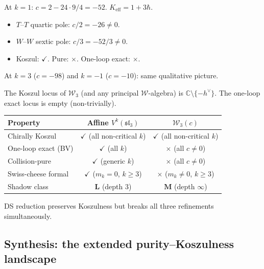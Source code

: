 \documentclass[11pt]{article}
\newcommand{\cW}{\mathcal{W}}
\newcommand{\fsl}{\mathfrak{sl}}
\newcommand{\C}{\mathbb{C}}
\begin{document}
\begin{computation}[Explicit: $\cW_3$ at $k = 1$ ($c = -52$)]
\label{comp:W3-k1}
At $k = 1$: $c = 2 - 24 \cdot 9/4 = -52$.
$K_{\mathrm{eff}} = 1 + 3\hbar$.
\begin{itemize}[nosep]
\item $T$--$T$ quartic pole: $c/2 = -26 \neq 0$.
\item $W$--$W$ sextic pole: $c/3 = -52/3 \neq 0$.
\item Koszul: $\checkmark$.  Pure: $\times$.  One-loop exact: $\times$.
\end{itemize}
At $k = 3$ ($c = -98$) and $k = -1$ ($c = -10$):
same qualitative picture.
\end{computation}

\begin{remark}
The Koszul locus of $\cW_3$ (and any principal
$\cW$-algebra) is $\C \setminus \{-h^\vee\}$.
The one-loop exact locus is empty (non-trivially).
\begin{center}
\renewcommand{\arraystretch}{1.25}
\begin{tabular}{@{}lcc@{}}
\toprule
\textbf{Property} & \textbf{Affine} $V^k(\fsl_3)$
  & \textbf{$\cW_3(c)$} \\
\midrule
Chirally Koszul & $\checkmark$ (all non-critical $k$)
  & $\checkmark$ (all non-critical $k$) \\
One-loop exact (BV) & $\checkmark$ (all $k$)
  & $\times$ (all $c \neq 0$) \\
Collision-pure & $\checkmark$ (generic $k$)
  & $\times$ (all $c \neq 0$) \\
Swiss-cheese formal & $\checkmark$ ($m_k = 0$, $k \geq 3$)
  & $\times$ ($m_k \neq 0$, $k \geq 3$) \\
Shadow class & $\mathbf{L}$ (depth $3$)
  & $\mathbf{M}$ (depth $\infty$) \\
\bottomrule
\end{tabular}
\end{center}
DS reduction preserves Koszulness but breaks all three
refinements simultaneously.
\end{remark}

\subsection{Synthesis: the extended purity--Koszulness landscape}
\label{subsec:purity-synthesis}
\end{document}
